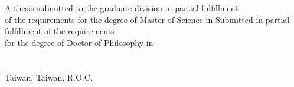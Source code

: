 %
%
%
%
%


\StartOralTempleteDocEng

\begin{minipage}[c][3.5cm][t]{\textwidth}
  \begin{center}
    \vspace{0.4cm}

    \makebox[\textwidth][c]{\parbox{\paperwidth}{\center \Large \GetEngTitle}}

    \vspace{0.5cm}

    \\

    \vspace{0.5cm}

    \makebox[\textwidth][c]{\Large \GetAuthorEngName}\\
  \end{center}
\end{minipage}


\vspace{1.3cm}


\begin{minipage}[c][5cm][t]{\textwidth}
  \begin{center}\Large %
  {%
    A thesis submitted to the graduate division in partial fulfillment\\
    of the requirements for the degree of Master of Science in%
  } %
  {%
    Submitted in partial fulfillment of the requirements\\%
    for the degree of Doctor of Philosophy in%
  } %
  \GetDeptEngName\\%
  \GetCollEngName\\%
  \GetSchoolEngName\\%
  Taiwan, Taiwan, R.O.C.\\%
  \vspace{0.1cm}
  \GetOralEngDay \thinspace \thinspace \GetThesisMonthInEng \thinspace \thinspace \GetThesisYear%
  \end{center}
\end{minipage}

